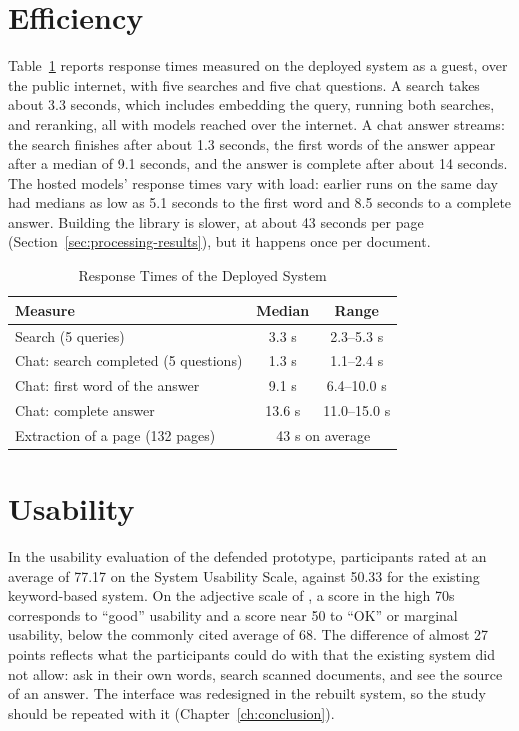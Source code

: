 \section{Efficiency}\label{sec:efficiency-results}

Table~\ref{tab:efficiency} reports response times measured on the deployed system as a guest, over the public internet, with five searches and five chat questions. A search takes about 3.3 seconds, which includes embedding the query, running both searches, and reranking, all with models reached over the internet. A chat answer streams: the search finishes after about 1.3 seconds, the first words of the answer appear after a median of 9.1 seconds, and the answer is complete after about 14 seconds. The hosted models' response times vary with load: earlier runs on the same day had medians as low as 5.1 seconds to the first word and 8.5 seconds to a complete answer. Building the library is slower, at about 43 seconds per page (Section~\ref{sec:processing-results}), but it happens once per document.

\begin{table}[htbp]
  \centering
  \caption{Response Times of the Deployed System}\label{tab:efficiency}
  \begin{tabular}{@{}lcc@{}}
    \toprule
    \textbf{Measure} & \textbf{Median} & \textbf{Range} \\
    \midrule
    Search (5 queries) & 3.3 s & 2.3--5.3 s \\
    Chat: search completed (5 questions) & 1.3 s & 1.1--2.4 s \\
    Chat: first word of the answer & 9.1 s & 6.4--10.0 s \\
    Chat: complete answer & 13.6 s & 11.0--15.0 s \\
    Extraction of a page (132 pages) & \multicolumn{2}{c}{43 s on average} \\
    \bottomrule
  \end{tabular}
\end{table}

\section{Usability}\label{sec:usability-results}

In the usability evaluation of the defended prototype, participants rated \cs{} at an average of 77.17 on the System Usability Scale, against 50.33 for the existing keyword-based system. On the adjective scale of \citet{bangor2009}, a score in the high 70s corresponds to ``good'' usability and a score near 50 to ``OK'' or marginal usability, below the commonly cited average of 68. The difference of almost 27 points reflects what the participants could do with \cs{} that the existing system did not allow: ask in their own words, search scanned documents, and see the source of an answer.  The interface was redesigned in the rebuilt system, so the study should be repeated with it (Chapter~\ref{ch:conclusion}).
